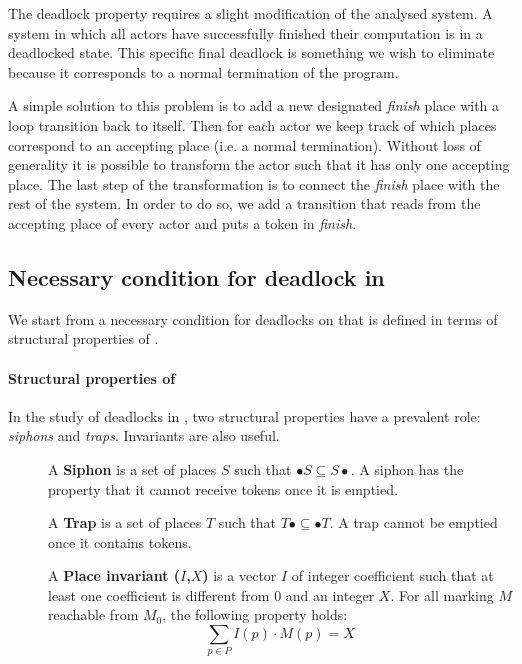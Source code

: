 \documentclass[a4paper]{report}
\numberwithin{algorithm}{chapter}
\begin{document}
The deadlock property requires a slight modification of the analysed system.
A system in which all actors have successfully finished their computation is in a deadlocked state.
This specific final deadlock is something we wish to eliminate because it corresponds to a normal termination of the program.

\label{placeFinish}
A simple solution to this problem is to add a new designated \emph{finish} place with a loop transition back to itself.
Then for each actor we keep track of which places correspond to an accepting place (i.e. a normal termination).
Without loss of generality it is possible to transform the actor such that it has only one accepting place.
The last step of the transformation is to connect the \emph{finish} place with the rest of the system.
In order to do so, we add a transition that reads from the accepting place of every actor and puts a token in \emph{finish}.

\subsection{Necessary condition for deadlock in \pns{}}
We start from a necessary condition for deadlocks on \pns{} that is defined in terms of structural properties of \pns{}.

\paragraph{Structural properties of \pns{}}
In the study of deadlocks in \pns{}, two structural properties have a prevalent role: \emph{siphons} and \emph{traps}.
Invariants are also useful.

\begin{description}
\item[]A \textbf{Siphon} is a set of places $S$ such that $ \bullet S \subseteq S \bullet $.
A siphon has the property that it cannot receive tokens once it is emptied.
\item[]A \textbf{Trap} is a set of places $T$ such that $ T \bullet \subseteq \bullet T $.
A trap cannot be emptied once it contains tokens.
\item[]A \textbf{Place invariant ($I$,$X$)} is a vector $I$ of integer coefficient such that at least one coefficient is different from 0 and an integer $X$.
For all marking $M$ reachable from $M_0$, the following property holds:
\begin{equation}
\sum_{p \in P} I(p) \cdot M(p) = X
\end{equation}
\label{defPI}
\end{description}
\end{document}
